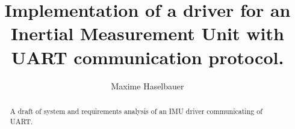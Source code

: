 \documentclass[a4paper,10pt]{article}
\title{Implementation of a driver for an Inertial Measurement Unit with UART communication protocol.}
\author{Maxime Haselbauer}
\begin{document}
\maketitle
\begin{abstract}
A draft of system and requirements analysis of an IMU driver communicating of UART.
\end{abstract}
\printnomenclature
\printglossaries









\printbibliography
\end{document}
